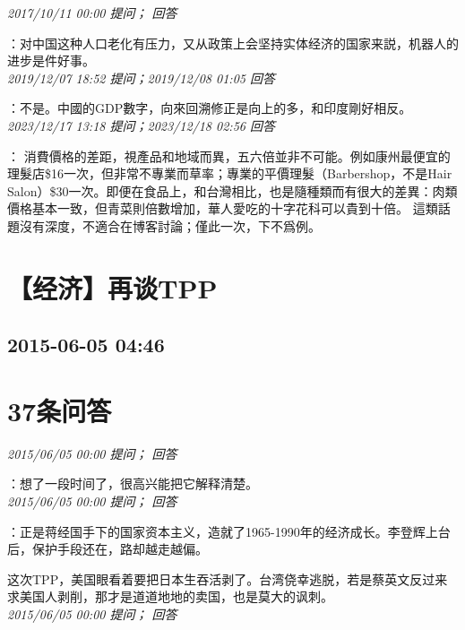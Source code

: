 \documentclass[twocolumn]{ctexart}
\begin{document}
\textit{\hfill\noindent\small 2017/10/11 00:00 提问； 回答}

：对中国这种人口老化有压力，又从政策上会坚持实体经济的国家来説，机器人的进步是件好事。\\

\textit{\hfill\noindent\small 2019/12/07 18:52 提问；2019/12/08 01:05 回答}

：不是。中國的GDP數字，向來回溯修正是向上的多，和印度剛好相反。
\\

\textit{\hfill\noindent\small 2023/12/17 13:18 提问；2023/12/18 02:56 回答}

：
消費價格的差距，視產品和地域而異，五六倍並非不可能。例如康州最便宜的理髮店\$16一次，但非常不專業而草率；專業的平價理髮（Barbershop，不是Hair Salon）\$30一次。即便在食品上，和台灣相比，也是隨種類而有很大的差異：肉類價格基本一致，但青菜則倍數增加，華人愛吃的十字花科可以貴到十倍。
這類話題沒有深度，不適合在博客討論；僅此一次，下不爲例。
\\


\section{【经济】再谈TPP}
\subsection{2015-06-05 04:46}


\section{37条问答}

\textit{\hfill\noindent\small 2015/06/05 00:00 提问； 回答}

：想了一段时间了，很高兴能把它解释清楚。\\

\textit{\hfill\noindent\small 2015/06/05 00:00 提问； 回答}

：正是蒋经国手下的国家资本主义，造就了1965-1990年的经济成长。李登辉上台后，保护手段还在，路却越走越偏。

这次TPP，美国眼看着要把日本生吞活剥了。台湾侥幸逃脱，若是蔡英文反过来求美国人剥削，那才是道道地地的卖国，也是莫大的讽刺。\\

\textit{\hfill\noindent\small 2015/06/05 00:00 提问； 回答}
\end{document}
